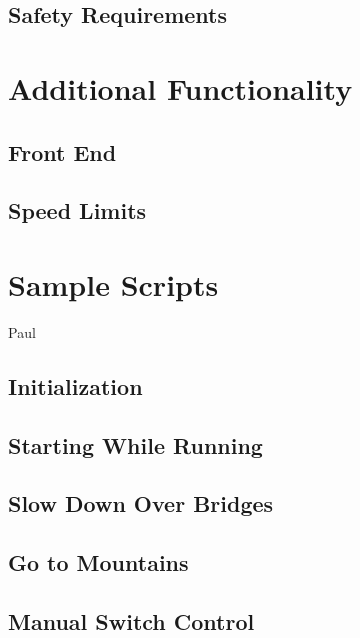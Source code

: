\documentclass[a4paper,11pt,notitlepage]{article}
\begin{document}
\subsection{Safety Requirements}

\section{Additional Functionality}
\subsection{Front End}
\subsection{Speed Limits}

\section{Sample Scripts}
Paul
\subsection{Initialization}
\subsection{Starting While Running}
\subsection{Slow Down Over Bridges}
\subsection{Go to Mountains}
\subsection{Manual Switch Control}
\end{document}
